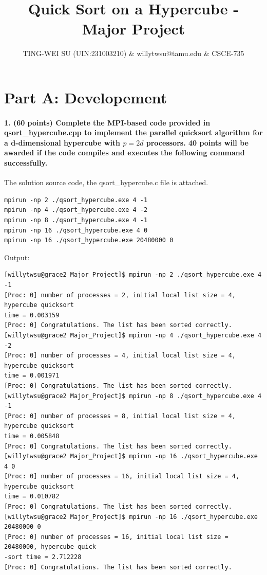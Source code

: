 \documentclass[pstricks,border=14pt,14pt]{article}
\title{Quick Sort on a Hypercube - Major Project}
\author{TING-WEI SU (UIN:231003210) & willytwsu@tamu.edu & CSCE-735}
\date{}
\begin{document}
\maketitle 
\part*{Part A: Developement}
\subsection*{1. (60 points) Complete the MPI-based code provided in qsort\_hypercube.cpp to implement the parallel quicksort algorithm for a d-dimensional hypercube with $p=2d$ processors. 40 points will be awarded if the code compiles and executes the following command successfully.}
The solution source code, the qsort\_hypercube.c file is attached.
\begin{verbatim}
mpirun -np 2 ./qsort_hypercube.exe 4 -1
mpirun -np 4 ./qsort_hypercube.exe 4 -2
mpirun -np 8 ./qsort_hypercube.exe 4 -1
mpirun -np 16 ./qsort_hypercube.exe 4 0
mpirun -np 16 ./qsort_hypercube.exe 20480000 0
\end{verbatim}
Output:
\begin{verbatim}
[willytwsu@grace2 Major_Project]$ mpirun -np 2 ./qsort_hypercube.exe 4 -1
[Proc: 0] number of processes = 2, initial local list size = 4, hypercube quicksort 
time = 0.003159
[Proc: 0] Congratulations. The list has been sorted correctly.
[willytwsu@grace2 Major_Project]$ mpirun -np 4 ./qsort_hypercube.exe 4 -2
[Proc: 0] number of processes = 4, initial local list size = 4, hypercube quicksort 
time = 0.001971
[Proc: 0] Congratulations. The list has been sorted correctly.
[willytwsu@grace2 Major_Project]$ mpirun -np 8 ./qsort_hypercube.exe 4 -1
[Proc: 0] number of processes = 8, initial local list size = 4, hypercube quicksort 
time = 0.005848
[Proc: 0] Congratulations. The list has been sorted correctly.
[willytwsu@grace2 Major_Project]$ mpirun -np 16 ./qsort_hypercube.exe 4 0
[Proc: 0] number of processes = 16, initial local list size = 4, hypercube quicksort 
time = 0.010782
[Proc: 0] Congratulations. The list has been sorted correctly.
[willytwsu@grace2 Major_Project]$ mpirun -np 16 ./qsort_hypercube.exe 20480000 0
[Proc: 0] number of processes = 16, initial local list size = 20480000, hypercube quick
-sort time = 2.712228
[Proc: 0] Congratulations. The list has been sorted correctly.
\end{verbatim} 
\end{document}
